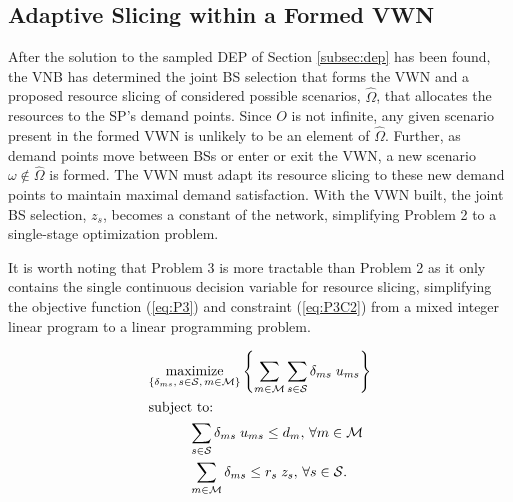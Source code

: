 \documentclass[conference]{IEEEtran}
\begin{document}
\subsection{Adaptive Slicing within a Formed VWN} \label{subsec:slice}

After the solution to the sampled DEP of Section \ref{subsec:dep} has been found, the VNB has determined the joint BS selection that forms the VWN and a proposed resource slicing of considered possible scenarios, $\hat{\Omega}$, that allocates the resources to the SP's demand points.  Since $O$ is not infinite, any given scenario present in the formed VWN is unlikely to be an element of $\hat{\Omega}$.  Further, as demand points move between BSs or enter or exit the VWN, a new scenario $\omega \notin \hat{\Omega}$ is formed.  The VWN must adapt its resource slicing to these new demand points to maintain maximal demand satisfaction.  With the VWN built, the joint BS selection, $z_s$, becomes a constant of the network, simplifying Problem 2 to a single-stage optimization problem.

It is worth noting that Problem 3 is more tractable than Problem 2 as it only contains the single continuous decision variable for resource slicing, simplifying the objective function (\ref{eq:P3}) and constraint (\ref{eq:P3C2}) from a mixed integer linear program to a linear programming problem.

\vspace{3mm}
\begin{tcolorbox}[title = Problem 3 (Deterministic Adaptive Slicing)]
\begin{align}
& \underset{\left\{ \substack{
	\delta_{ms},\,	s \in \mathcal{S},\, m \in \mathcal{M}} \right\}} {\text{maximize}}
\left\{ \sum_{m \in \mathcal{M}} \sum_{s \in \mathcal{S}} \delta_{ms} \; u_{ms} \right\} \label{eq:P3}\\
& \text{subject to:}  \nonumber \\
& \hspace{0.4in} \sum_{s \in \mathcal{S}} \delta_{ms} \; u_{ms} \leq d_m,\, \forall m \in \mathcal{M} \label{eq:P3C1}\\
& \hspace{0.4in} \sum_{m \in \mathcal{M}} \delta_{ms} \leq r_s \; z_s,\, \forall s \in \mathcal{S}. \label{eq:P3C2}
\end{align}
\end{tcolorbox}

\end{document}
